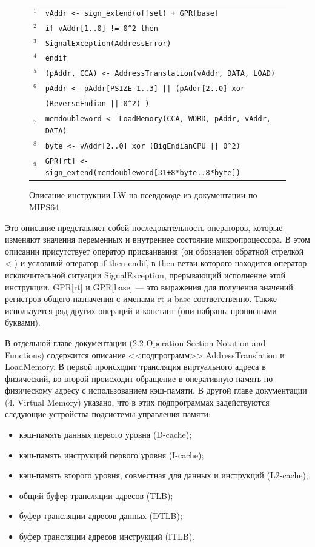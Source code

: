 \begin{figure}[h]
\begin{tabular}{cl}
    ${ }^1$ & \texttt{vAddr <- sign\_extend(offset) + GPR[base]}\\
    ${ }^2$ & \texttt{if vAddr[1..0] != 0\^{ }2 then}\\
    ${ }^3$ & \hspace{2cm} \texttt{SignalException(AddressError)}\\
    ${ }^4$ & \texttt{endif}\\
    ${ }^5$ & \texttt{(pAddr, CCA) <- AddressTranslation(vAddr, DATA, LOAD)}\\
    ${ }^6$ & \texttt{pAddr <- pAddr[PSIZE-1..3] || (pAddr[2..0] xor}\\
       & \hspace{5cm} \texttt{(ReverseEndian || 0\^{ }2) )}\\
    ${ }^7$ & \texttt{memdoubleword <- LoadMemory(CCA, WORD, pAddr, vAddr, DATA)}\\
    ${ }^8$ & \texttt{byte <- vAddr[2..0] xor (BigEndianCPU || 0\^{ }2)}\\
    ${ }^9$ & \texttt{GPR[rt] <- sign\_extend(memdoubleword[31+8*byte..8*byte])}\\
\end{tabular}
\caption{Описание инструкции LW на псевдокоде из документации по MIPS64}\label{fig:lw_exmp}
\end{figure}

Это описание представляет собой последовательность операторов, которые изменяют значения переменных и внутреннее состояние микропроцессора. В этом описании присутствует оператор присваивания (он обозначен обратной стрелкой <-) и условный оператор if-then-endif, в then-ветви которого находится оператор исключительной ситуации SignalException, прерывающий исполнение этой инструкции. GPR[rt] и GPR[base] --- это выражения для получения значений регистров общего назначения с именами rt и base соответственно. Также используется ряд других операций и констант (они набраны прописными буквами).

В отдельной главе документации (2.2 Operation Section Notation and\\Functions) содержится описание <<подпрограмм>> AddressTranslation и LoadMemory. В первой происходит трансляция виртуального адреса в физический, во второй происходит обращение в оперативную память по физическому адресу с использованием кэш-памяти. В другой главе документации (4. Virtual Memory) указано, что в этих подпрограммах задействуются следующие устройства подсистемы управления памяти:
\begin{itemize}
  \item кэш-память данных первого уровня (D-cache);
  \item кэш-память инструкций первого уровня (I-cache);
  \item кэш-память второго уровня, совместная для данных и инструкций (L2-cache);
  \item общий буфер трансляции адресов (TLB);
  \item буфер трансляции адресов данных (DTLB);
  \item буфер трансляции адресов инструкций (ITLB).
\end{itemize}

